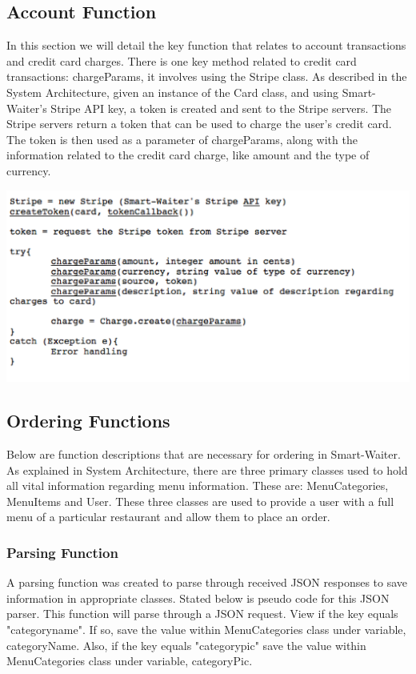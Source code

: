 \documentclass[12pt, titlepage]{article}
\begin{document}
\subsection{Account Function}
In this section we will detail the key function that relates to account transactions and credit card charges. There is one key method related to credit card transactions: chargeParams, it involves using the Stripe class. As described in the System Architecture, given an instance of the Card class, and using Smart-Waiter's Stripe API key, a token is created and sent to the Stripe servers. The Stripe servers return a token that can be used to charge the user's credit card. The token is then used as a parameter of chargeParams, along with the information related to the credit card charge, like amount and the type of currency. 

\includegraphics[width=150mm,scale=0.5]{stripe.png}

\subsection{Ordering Functions}
Below are function descriptions that are necessary for ordering in Smart-Waiter. As explained in System Architecture, there are three primary classes used to hold all vital information regarding menu information. These are: MenuCategories, MenuItems and User. These three classes are used to provide a user with a full menu of a particular restaurant and allow them to place an order.

\subsubsection{Parsing Function}
A parsing function was created to parse through received JSON responses to save information in appropriate classes. Stated below is pseudo code for this JSON parser. This function will parse through a JSON request. View if the key equals "categoryname". If so, save the value within MenuCategories class under variable, categoryName. Also, if the key equals "categorypic" save the value within MenuCategories class under variable, categoryPic.
\end{document}
